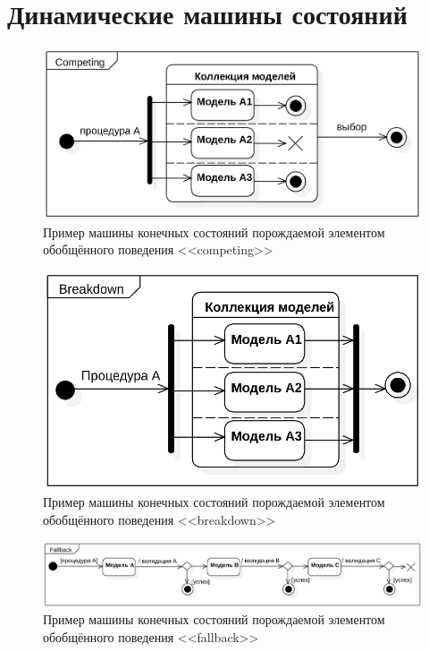 \chapter{Динамические машины состояний}
\label{appendix:fsm-machine-prog}

\begin{figure}
    \centering
    \includegraphics[width=0.65\linewidth]{images/umff-competing-diagram-02.eps}
    \caption{Пример машины конечных состояний порождаемой
    элементом обобщённого поведения <<competing>>}
    \label{fig:competing-example}
\end{figure}

\begin{figure}
    \centering
    \includegraphics[width=0.55\linewidth]{images/umff-breakdown-diagram-01.eps}
    \caption{Пример машины конечных состояний порождаемой
    элементом обобщённого поведения <<breakdown>>}
    \label{fig:breakdown-example}
\end{figure}

\begin{figure}
    \centering
    \includegraphics[width=0.95\linewidth]{images/umff-fallback-example-01.eps}
    \caption{Пример машины конечных состояний порождаемой элементом обобщённого
    поведения <<fallback>>}
    \label{fig:fallback-example}
\end{figure}


